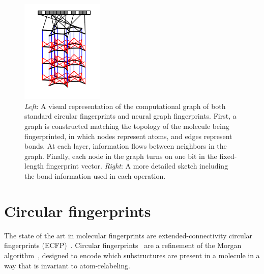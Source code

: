 \documentclass{article}
\newcommand{\citep}{\cite}
\begin{document}
\begin{figure}
\centerline{\includegraphics[width=0.35\textwidth, clip, trim=4mm 12mm 4mm 4mm]{fig_1.pdf}
\hspace{5em}
}
\vspace{-1mm}
\caption{\emph{Left}: A visual representation of the computational graph of both standard circular fingerprints and neural graph fingerprints.
First, a graph is constructed matching the topology of the molecule being fingerprinted, in which nodes represent atoms, and edges represent bonds.
At each layer, information flows between neighbors in the graph.
Finally, each node in the graph turns on one bit in the fixed-length fingerprint vector.
\emph{Right}: A more detailed sketch including the bond information used in each operation.}
\label{fig:architecture sketch}
\end{figure}

\section{Circular fingerprints}
\vspace{-3mm}
The state of the art in molecular fingerprints are extended-connectivity circular fingerprints (ECFP)~\citep{ECFP2010}.
Circular fingerprints~\citep{glem2006circular} are a refinement of the Morgan algorithm~\citep{morgan1965generation}, designed to encode which substructures are present in a molecule in a way that is invariant to atom-relabeling.
\end{document}
